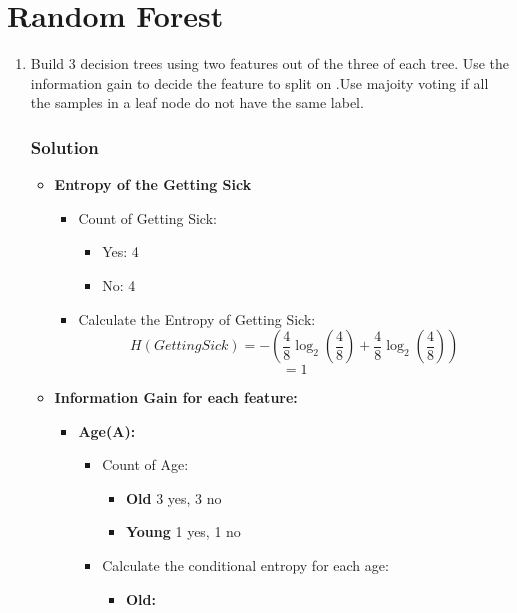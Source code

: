 \documentclass{article}
\begin{document}
\clearpage

\section{Random Forest}
\begin{enumerate}[label=\alph*)]
   \item Build 3 decision trees using two features out of the three of each tree. Use the information gain to decide the feature to split on .Use majoity
   voting if all the samples in a leaf node do not have the same label.

   \subsubsection*{Solution}
   \begin{itemize}
      \item \textbf{Entropy of the Getting Sick}
      \begin{itemize}
         \item Count of Getting Sick:
         \begin{itemize}
            \item Yes: 4
            \item No: 4
         \end{itemize}
         \item Calculate the Entropy of Getting Sick:
         \[
         H(Getting Sick) = -(\frac{4}{8} \log_2(\frac{4}{8}) + \frac{4}{8} \log_2(\frac{4}{8}))
         \]
         \[
         = 1
         \]
      \end{itemize}
      \item \textbf{Information Gain for each feature:}
      \begin{itemize}
         \item \textbf{Age(A):}
         \begin{itemize}
            \item Count of Age:
            \begin{itemize}
               \item \textbf{Old} 3 yes, 3 no
               \item \textbf{Young} 1 yes, 1 no
            \end{itemize}
            \item Calculate the conditional entropy for each age:
            \begin{itemize}
               \item \textbf{Old:}
               \[
\]
\end{itemize}
\end{itemize}
\end{itemize}
\end{itemize}
\end{enumerate}
\end{document}
